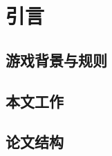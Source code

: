 \chapter{引言}
\label{chap:introduction}

\section{游戏背景与规则}

\section{本文工作}

\section{论文结构}

\cite{Book:GV1996}
